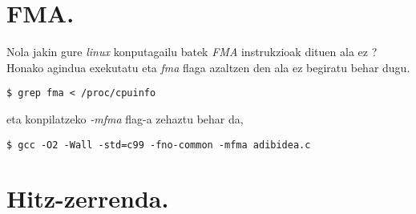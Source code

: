 \section{FMA.}

Nola jakin gure \emph{linux} konputagailu batek \emph{FMA} instrukzioak dituen ala ez ? Honako agindua exekutatu eta \emph{fma} flaga azaltzen den ala ez begiratu behar dugu.
\begin{lstlisting}
$ grep fma < /proc/cpuinfo
\end{lstlisting}
eta konpilatzeko \emph{-mfma} flag-a zehaztu behar da,
\begin{lstlisting}
$ gcc -O2 -Wall -std=c99 -fno-common -mfma adibidea.c
\end{lstlisting}

\section{Hitz-zerrenda.}

